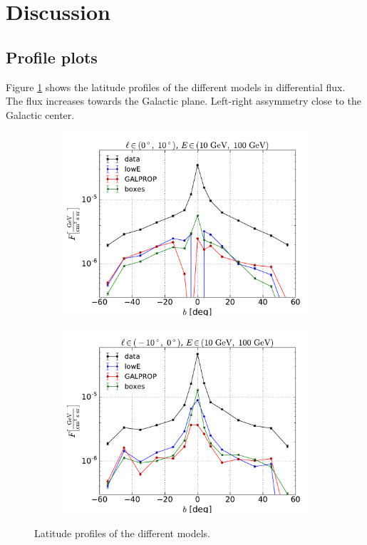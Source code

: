 \section{Discussion}


\subsection{Profile plots}


Figure \ref{fig:Profiles} shows the latitude profiles of the different models in differential flux. The flux increases towards the Galactic plane. Left-right assymmetry close to the Galactic center. 


\begin{figure}[h!]
    \begin{subfigure}{0.5\textwidth}
        \includegraphics[width=\textwidth]{plots/Profiles_l=1_source_range_1.pdf}
    \end{subfigure} 
    \begin{subfigure}{0.5\textwidth}
        \includegraphics[width=\textwidth]{plots/Profiles_l=0_source_range_1.pdf}
    \end{subfigure}
  	\caption{Latitude profiles of the different models.}
  	\label{fig:Profiles}
\end{figure}

